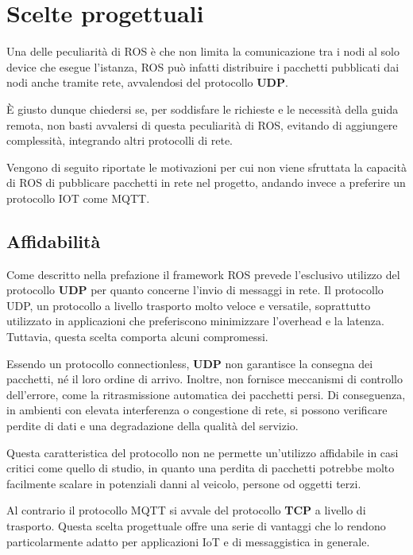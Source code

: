 \section{Scelte progettuali}
Una delle peculiarità di ROS è che non limita la comunicazione tra i nodi al solo device che esegue l'istanza, ROS può infatti distribuire i pacchetti pubblicati dai nodi anche tramite rete, avvalendosi del protocollo \textbf{UDP}. 

\noindent È giusto dunque chiedersi se, per soddisfare le richieste e le necessità della guida remota, non basti avvalersi di questa peculiarità di ROS, evitando di aggiungere complessità, integrando altri protocolli di rete. 

\noindent Vengono di seguito riportate le motivazioni per cui non viene sfruttata la capacità di ROS di pubblicare pacchetti in rete nel progetto, andando invece a preferire un protocollo IOT come MQTT.

\subsection{Affidabilità}
Come descritto nella prefazione il framework ROS prevede l'esclusivo utilizzo del protocollo \textbf{UDP} per quanto concerne l'invio di messaggi in rete. Il protocollo UDP, un protocollo a livello trasporto molto veloce e versatile, soprattutto utilizzato in applicazioni che preferiscono minimizzare l'overhead e la latenza. Tuttavia, questa scelta comporta alcuni compromessi. 

\noindent Essendo un protocollo connectionless, \textbf{UDP} non garantisce la consegna dei pacchetti, né il loro ordine di arrivo. Inoltre, non fornisce meccanismi di controllo dell'errore, come la ritrasmissione automatica dei pacchetti persi. Di conseguenza, in ambienti con elevata interferenza o congestione di rete, si possono verificare perdite di dati e una degradazione della qualità del servizio.

\noindent Questa caratteristica del protocollo non ne permette un'utilizzo affidabile in casi critici come quello di studio, in quanto una perdita di pacchetti potrebbe molto facilmente scalare in potenziali danni al veicolo, persone od oggetti terzi.

\noindent Al contrario il protocollo MQTT si avvale del protocollo \textbf{TCP} a livello di trasporto. Questa scelta progettuale offre una serie di vantaggi che lo rendono particolarmente adatto per applicazioni IoT e di messaggistica in generale.

